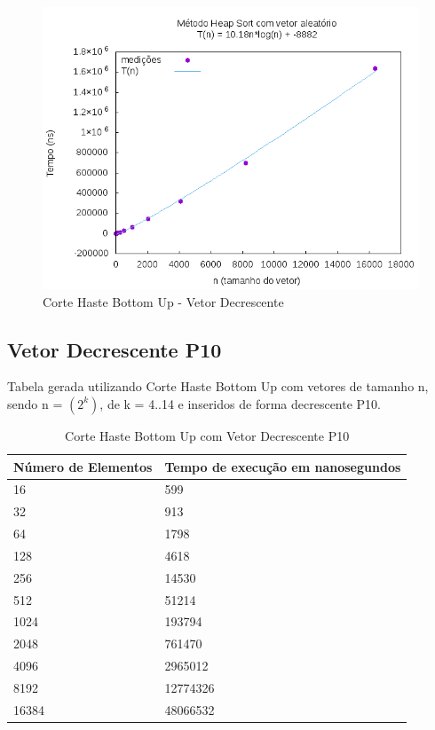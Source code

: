 \documentclass[12pt,a4paper,twoside]{report}
\begin{document}
\begin{figure}[H]
    \centering
    \includegraphics[width=0.7\linewidth]{graficos/HeapSort/vIntAleatorio/vIntAleatorio.png}
  \caption{Corte Haste Bottom Up - Vetor Decrescente}
\end{figure}





\subsection{Vetor Decrescente P10}
Tabela gerada utilizando Corte Haste Bottom Up com vetores de tamanho n, sendo n = $(2^k)$, de k = 4..14 e inseridos de forma decrescente P10.
\begin{table}[H]
\centering
\caption{Corte Haste Bottom Up com Vetor Decrescente P10}
\label{my-label}
\begin{tabular}{|l|l|}
\hline
\multicolumn{1}{|c|}{\textbf{Número de Elementos}} & \multicolumn{1}{c|}{\textbf{Tempo de execução em nanosegundos}} \\ \hline
16 & 599 \\ \hline
32 & 913 \\ \hline
64 & 1798 \\ \hline
128 & 4618 \\ \hline
256 & 14530 \\ \hline
512 & 51214 \\ \hline
1024 & 193794 \\ \hline
2048 & 761470 \\ \hline
4096 & 2965012 \\ \hline
8192 & 12774326 \\ \hline
16384 & 48066532 \\ \hline
\end{tabular}
\end{table}
\end{document}

